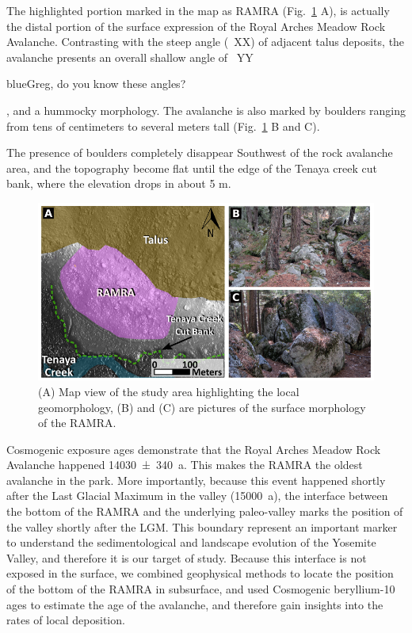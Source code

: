 \documentclass[utf8]{frontiersSCNS}
\newcommand{\COMON}{\begin{color}{blue}}
\newcommand{\COMOFF}{\end{color}}
\begin{document}
The highlighted portion marked in the map as RAMRA (Fig.~\ref{RAMRA} A), is actually the distal portion of the surface expression of the Royal Arches Meadow Rock Avalanche. Contrasting with the steep angle (~XX) of adjacent talus deposits, the avalanche presents an overall shallow angle of ~YY \COMON Greg, do you know these angles? \COMOFF, and a hummocky morphology. The avalanche is also marked by boulders ranging from tens of centimeters to several meters tall (Fig.~\ref{RAMRA} B and C).

The presence of boulders completely disappear Southwest of the rock avalanche area, and the topography become flat until the edge of the Tenaya creek cut bank, where the elevation drops in about 5 m. 



\begin{figure}[h]
  
  \includegraphics[width=\textwidth]{RAMRA.png}
  \caption{(A) Map view of the study area highlighting the local geomorphology, (B) and (C) are pictures of the surface morphology of the RAMRA.  
    \label{RAMRA}}
  
\end{figure}



Cosmogenic  exposure ages demonstrate that the Royal Arches Meadow Rock Avalanche happened \SI{14030 +- 340}{a}. This makes the RAMRA the oldest avalanche in the park. More importantly, because this event happened shortly after the Last Glacial Maximum in the valley (\SI{15000}{a}), the interface between the bottom of the RAMRA and the underlying paleo-valley marks the position of the valley shortly after the LGM. This boundary represent an important marker to understand the sedimentological and landscape evolution of the Yosemite Valley, and therefore it is our target of study. Because this interface is not exposed in the surface, we combined geophysical methods to locate the position of the bottom of the RAMRA in subsurface, and used Cosmogenic beryllium-10 ages to estimate the age of the avalanche, and therefore  gain insights into the rates of local deposition.
\end{document}

